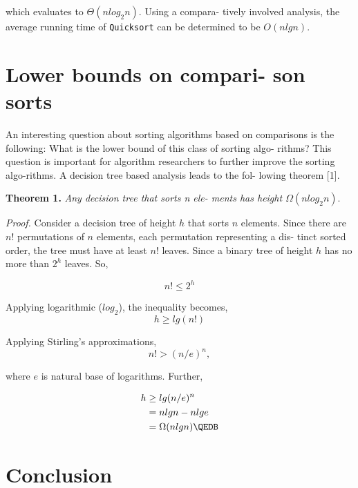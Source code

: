 \documentclass[a4paper, 10pt,twocolumn]{article}
\begin{document}
which evaluates to $\Theta(nlog_{2}n)$. Using a compara-
tively involved analysis, the average running time
of \texttt{Quicksort} can be determined to be $O(n lg n)$.

\section{ Lower bounds on compari-
son sorts}

An interesting question about sorting algorithms
based on comparisons is the following: What is
the lower bound of this class of sorting algo-
rithms? This question is important for algorithm
researchers to further improve the sorting algo-rithms.
A decision tree based analysis leads to the fol-
lowing theorem [1].

\textbf{Theorem 1.} \textit{ Any decision tree that sorts n ele-
ments has height $\Omega(nlog_{2}n)$}.

\textit{Proof.} Consider a decision tree of height $h$ that
sorts $n$ elements. Since there are $n!$ permutations
of $n$ elements, each permutation representing a dis-
tinct sorted order, the tree must have at least $n!$ leaves. Since a binary tree of height $h$ has no more than $2^{h}$ leaves. So,

\indent 
\begin{equation*}
    n! \leq 2^{h}
\end{equation*}

Applying logarithmic ($log_{2}$), the inequality becomes,
\indent 
\begin{equation*}
    h \geq lg(n!)
\end{equation*}

Applying Stirling’s approximations,
\indent 
\begin{equation*}
    n! >  (n/e)^{n},
\end{equation*}

where $e$ is natural base of logarithms. Further,


\indent
\begin{align*}
    h   &\geq lg(n/e)^{n} \\
        &= nlgn - n lg e \\
        &= \Omega(n lg n) \QEDB \\
\end{align*}

\section{Conclusion}
\end{document}
